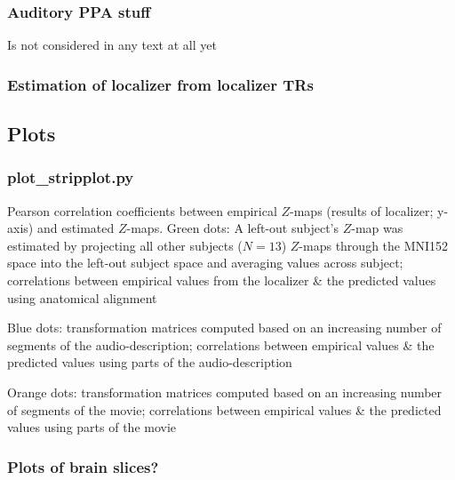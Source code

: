 \subsubsection{Auditory PPA stuff}

Is not considered in any text at all yet


\subsubsection{Estimation of localizer from localizer TRs}




\subsection{Plots}

\subsubsection{plot\_stripplot.py}

%
Pearson correlation coefficients between empirical $Z$-maps (results of
localizer; y-axis) and estimated $Z$-maps.
%
Green dots: A left-out subject's $Z$-map was estimated by projecting all other
subjects ($N = 13$) $Z$-maps through the MNI152 space into the left-out subject
space and averaging values across subject; correlations between empirical values
from the localizer \& the predicted values using anatomical alignment

%
Blue dots: transformation matrices computed based on an increasing number of
segments of the audio-description; correlations between empirical values \& the
predicted values using parts of the audio-description

%
Orange dots: transformation matrices computed based on an increasing number of
segments of the movie; correlations between empirical values \& the predicted
values using parts of the movie


\subsubsection{Plots of brain slices?}



